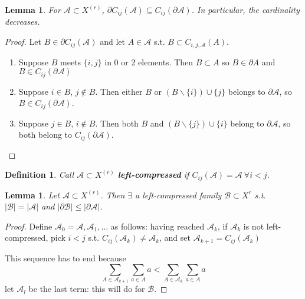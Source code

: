 \documentclass[a4paper]{article}
\newtheorem*{definition}{Definition}
\newtheorem{lemma}[theorem]{Lemma}
\newcommand*\abs[1]{\left|#1\right|}
\begin{document}
\begin{lemma}
	For $\mathcal{A} \subset X^{(r)}$, $\partial C_{ij}(\mathcal{A}) \subseteq C_{ij}(\partial \mathcal{A})$. In particular, the cardinality decreases.
\end{lemma}
\begin{proof}
	Let $B \in \partial C_{ij}(\mathcal{A})$ and let $A \in \mathcal{A}$ s.t. $B \subset C_{i,j,\mathcal{A}}(A)$.
	\begin{enumerate}[label=\roman*.]
		\item Suppose $B$ meets $\{i,j\}$ in 0 or 2 elements. Then $B \subset A$ so $B \in \partial A$ and $B \in C_{ij}(\partial \mathcal{A})$
		\item Suppose $i \in B$, $j \not\in B$. Then either $B$ or $(B \backslash \{i\}) \cup \{j\}$ belongs to $\partial \mathcal{A}$, so $B \in C_{ij}(\partial \mathcal{A})$.
		\item Suppose $j \in B$, $i \not\in B$. Then both $B$ and $(B \backslash \{j\}) \cup \{i\}$ belong to $\partial\mathcal{A}$, so both belong to $C_{ij}(\partial\mathcal{A})$.
	\end{enumerate}
\end{proof}
\begin{definition}
	Call $\mathcal{A} \subset X^{(r)}$ \textbf{left-compressed} if $C_{ij}(\mathcal{A}) = \mathcal{A}\ \forall i < j$.
\end{definition}

\begin{lemma}
	Let $\mathcal{A} \subset X^{(r)}$. Then $\exists$ a left-compressed family $\mathcal{B} \subset X^{r}$ s.t. $\abs{\mathcal{B}}=\abs{\mathcal{A}}$ and $\abs{\partial\mathcal{B}} \leq \abs{\partial\mathcal{A}}$.
\end{lemma}
\begin{proof}
	Define $\mathcal{A}_0 = \mathcal{A}, \mathcal{A}_1, \dots$ as follows: having reached $\mathcal{A}_k$, if $\mathcal{A}_k$ is not left-compressed, pick $i < j$ s.t. $C_{ij}(\mathcal{A}_k) \neq \mathcal{A}_k$, and set $\mathcal{A}_{k+1} = C_{ij}(\mathcal{A}_k)$
	
	This sequence has to end because $$\sum_{A \in \mathcal{A}_{k+1}} \sum_{a \in A} a < \sum_{A \in \mathcal{A}_{k}} \sum_{a \in A} a$$ let $\mathcal{A}_l$ be the last term: this will do for $\mathcal{B}$.
\end{proof}
\end{document}
